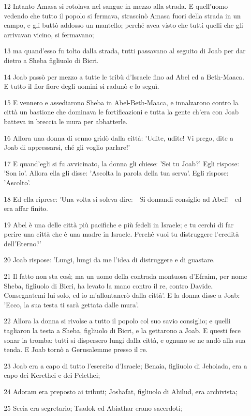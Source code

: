 \par 12 Intanto Amasa si rotolava nel sangue in mezzo alla strada. E quell'uomo vedendo che tutto il popolo si fermava, strascinò Amasa fuori della strada in un campo, e gli buttò addosso un mantello; perché avea visto che tutti quelli che gli arrivavan vicino, si fermavano;
\par 13 ma quand'esso fu tolto dalla strada, tutti passavano al seguito di Joab per dar dietro a Sheba figliuolo di Bicri.
\par 14 Joab passò per mezzo a tutte le tribù d'Israele fino ad Abel ed a Beth-Maaca. E tutto il fior fiore degli uomini si radunò e lo seguì.
\par 15 E vennero e assediarono Sheba in Abel-Beth-Maaca, e innalzarono contro la città un bastione che dominava le fortificazioni e tutta la gente ch'era con Joab batteva in breccia le mura per abbatterle.
\par 16 Allora una donna di senno gridò dalla città: 'Udite, udite! Vi prego, dite a Joab di appressarsi, ché gli voglio parlare!'
\par 17 E quand'egli si fu avvicinato, la donna gli chiese: 'Sei tu Joab?' Egli rispose: 'Son io'. Allora ella gli disse: 'Ascolta la parola della tua serva'. Egli rispose: 'Ascolto'.
\par 18 Ed ella riprese: 'Una volta si soleva dire: - Si domandi consiglio ad Abel! - ed era affar finito.
\par 19 Abel è una delle città più pacifiche e più fedeli in Israele; e tu cerchi di far perire una città che è una madre in Israele. Perché vuoi tu distruggere l'eredità dell'Eterno?'
\par 20 Joab rispose: 'Lungi, lungi da me l'idea di distruggere e di guastare.
\par 21 Il fatto non sta così; ma un uomo della contrada montuosa d'Efraim, per nome Sheba, figliuolo di Bicri, ha levato la mano contro il re, contro Davide. Consegnatemi lui solo, ed io m'allontanerò dalla città'. E la donna disse a Joab: 'Ecco, la sua testa ti sarà gettata dalle mura'.
\par 22 Allora la donna si rivolse a tutto il popolo col suo savio consiglio; e quelli tagliaron la testa a Sheba, figliuolo di Bicri, e la gettarono a Joab. E questi fece sonar la tromba; tutti si dispersero lungi dalla città, e ognuno se ne andò alla sua tenda. E Joab tornò a Gerusalemme presso il re.
\par 23 Joab era a capo di tutto l'esercito d'Israele; Benaia, figliuolo di Jehoiada, era a capo dei Kerethei e dei Pelethei;
\par 24 Adoram era preposto ai tributi; Joshafat, figliuolo di Ahilud, era archivista;
\par 25 Sceia era segretario; Tsadok ed Abiathar erano sacerdoti;

